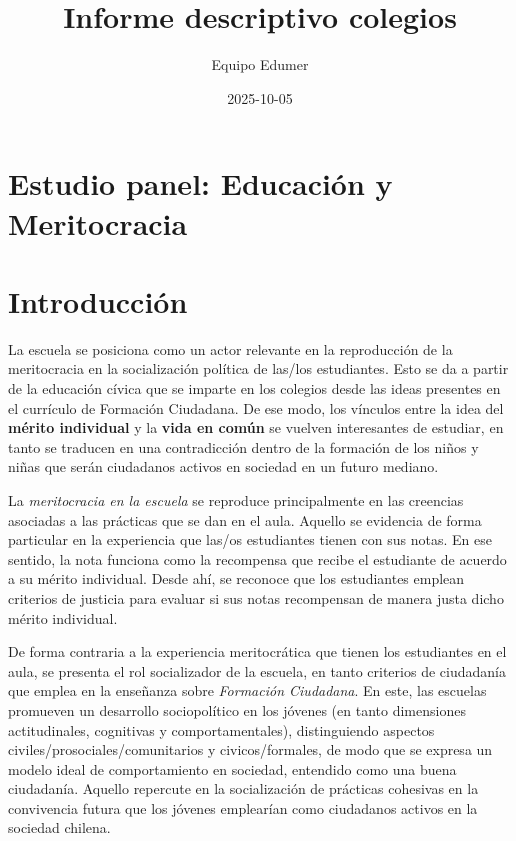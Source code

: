\documentclass[
  letterpaper,
  DIV=11,
  numbers=noendperiod]{scrreprt}
\title{Informe descriptivo colegios}
\author{Equipo Edumer}
\date{2025-10-05}
\renewcommand*\contentsname{Table of contents}
\newcommand\contentsname{Table of contents}
\begin{document}
\maketitle

\renewcommand*\contentsname{Table of contents}
{
\hypersetup{linkcolor=}
\setcounter{tocdepth}{2}
\tableofcontents
}

\chapter*{Estudio panel: Educación y
Meritocracia}\label{estudio-panel-educaciuxf3n-y-meritocracia}



\chapter{Introducción}\label{introducciuxf3n}

La escuela se posiciona como un actor relevante en la reproducción de la
meritocracia en la socialización política de las/los estudiantes. Esto
se da a partir de la educación cívica que se imparte en los colegios
desde las ideas presentes en el currículo de Formación Ciudadana. De ese
modo, los vínculos entre la idea del \textbf{mérito individual} y la
\textbf{vida en común} se vuelven interesantes de estudiar, en tanto se
traducen en una contradicción dentro de la formación de los niños y
niñas que serán ciudadanos activos en sociedad en un futuro mediano.~

La \emph{meritocracia en la escuela} se reproduce principalmente en las
creencias asociadas a las prácticas que se dan en el aula. Aquello se
evidencia de forma particular en la experiencia que las/os estudiantes
tienen con sus notas. En ese sentido, la nota funciona como la
recompensa que recibe el estudiante de acuerdo a su mérito individual.
Desde ahí, se reconoce que los estudiantes emplean criterios de justicia
para evaluar si sus notas recompensan de manera justa dicho mérito
individual.

De forma contraria a la experiencia meritocrática que tienen los
estudiantes en el aula, se presenta el rol socializador de la escuela,
en tanto criterios de ciudadanía que emplea en la enseñanza sobre
\emph{Formación Ciudadana}. En este, las escuelas promueven un
desarrollo sociopolítico en los jóvenes (en tanto dimensiones
actitudinales, cognitivas y comportamentales), distinguiendo aspectos
civiles/prosociales/comunitarios y civicos/formales, de modo que se
expresa un modelo ideal de comportamiento en sociedad, entendido como
una buena ciudadanía. Aquello repercute en la socialización de prácticas
cohesivas en la convivencia futura que los jóvenes emplearían como
ciudadanos activos en la sociedad chilena.
\end{document}
